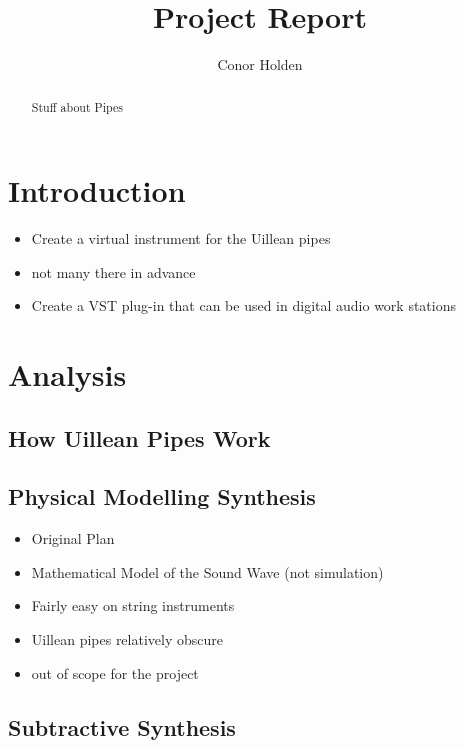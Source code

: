 \documentclass{article}
\title{Project Report}
\author{Conor Holden }
\begin{document}
	
	\maketitle
	
	\begin{abstract}
	Stuff about Pipes
	
		
	\end{abstract}

	
	
	
	\tableofcontents
	
	
	\section{Introduction}
	
	\begin{itemize}
		\item Create a virtual instrument for the Uillean pipes
		\item not many there in advance
		\item Create a VST plug-in that can be used in digital audio work stations
	\end{itemize}
	
	
	\section{Analysis}
	
	
	\subsection{How Uillean Pipes Work}	
	
	\subsection{Physical Modelling Synthesis}
	\begin{itemize}
		\item Original Plan
		\item Mathematical Model of the Sound Wave (not simulation)
		\item Fairly easy on string instruments
		\item Uillean pipes relatively obscure
		\item out of scope for the project
	\end{itemize}

	\subsection{Subtractive Synthesis}
	
\end{document}
